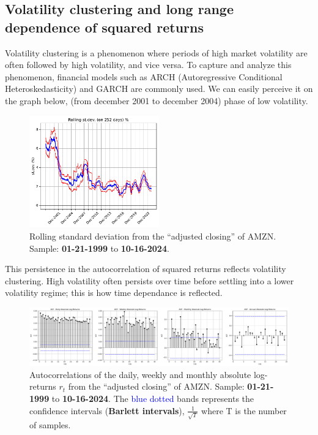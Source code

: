 \documentclass{article}
\begin{document}
\subsection{Volatility clustering and long range dependence of squared returns}

Volatility clustering is a phenomenon where periods of high market volatility are often followed by high volatility, and vice versa. To capture and analyze this phenomenon, financial models such as ARCH (Autoregressive Conditional Heteroskedasticity) and GARCH are commonly used. We can easily perceive it on the graph below, (from december 2001 to december 2004) phase of low volatility.

\begin{figure}[H]
    \centering
    \includegraphics[width=0.5\textwidth]{Img/Fact7_AMZN_rolling_stdev.pdf}
    \caption{Rolling standard deviation from the “adjusted closing” of AMZN. Sample: \textbf{01-21-1999} to \textbf{10-16-2024}.}
    \label{fig:Rolling_std_dev_1}
\end{figure}

\noindent This persistence in the autocorrelation of squared returns reflects volatility clustering. 
High volatility often persists over time before settling into a lower volatility regime; 
this is how time dependance is reflected.



\begin{figure}[H]
    \centering
    \includegraphics[width=1\textwidth]{Img/Fact7_AbsoluteLogReturns.pdf}
    \caption{Autocorrelations of the daily, weekly and monthly absolute log-returns $r_t$ from the “adjusted closing” of AMZN. Sample: \textbf{01-21-1999} to \textbf{10-16-2024}.
    The \textcolor{blue}{blue dotted} bands represents the confidence intervals (\textbf{Barlett intervals}), $\frac{1}{\sqrt{T}}$ where T is the number of samples.}
    \label{fig:atocorrelation_abs_logreturns}
\end{figure}
\end{document}

